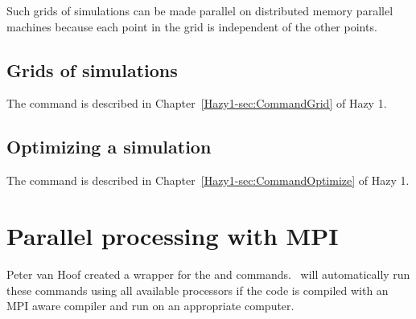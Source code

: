 Such grids of simulations can be made parallel on distributed memory
parallel machines because each point in the grid is independent of the
other points.

\subsection{Grids of simulations}

The  command is described in
Chapter~\ref{Hazy1-sec:CommandGrid}
 of Hazy 1.

\subsection{Optimizing a simulation}

The  command is described in
Chapter~\ref{Hazy1-sec:CommandOptimize}
 of Hazy 1.


\section{Parallel processing with MPI}
\label{sec:ParallelMPI}

Peter van Hoof created a wrapper for the 
 and  commands.
\Cloudy\ will automatically run these commands using
all available processors if the code is compiled with 
an MPI aware compiler and run on an appropriate computer.
